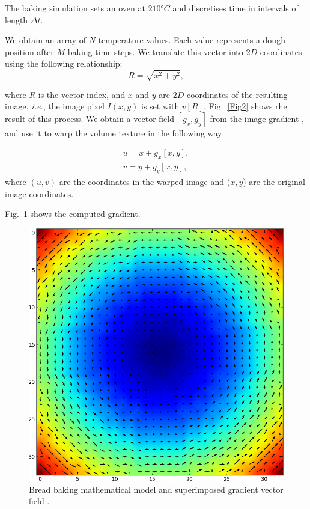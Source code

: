 \documentclass[final,5p,times]{elsarticle}
\begin{document}
The baking simulation sets an oven at $210°C$ and discretises time in intervals of length $\Delta t$. 

We obtain an array of $N$ temperature values. Each value represents a dough position after $M$ baking time steps. We translate this vector into $2D$ coordinates using the following relationship:
\begin{equation}
R = \sqrt{x^{2}+y^{2}},
\end{equation}


\noindent where $R$ is the vector index, and $x$ and $y$ are $2D$ coordinates of the resulting image, {\em i.e.}, the image pixel $I(x,y)$ is set with $v[R]$. Fig.~\ref{Fig2} shows rhe result of this process. We obtain a vector field $[g_{x},g_{y}]$ from the image gradient \cite{Gonzalez2006}, and use it to warp the volume texture in the following way:

\begin{eqnarray}
u = x+g_{x}[x,y],\\
v = y+g_{y}[x,y],
\end{eqnarray}
\noindent where $(u,v)$ are the coordinates in the warped image and ($x,y$) are the original image coordinates.

Fig.~\ref{Fig3} shows the computed gradient. 


\begin{figure}
\includegraphics[scale=0.4]{vfield.png}
\caption{Bread baking mathematical model and superimposed gradient vector field .}
\label{Fig3}
\end{figure}
\end{document}
